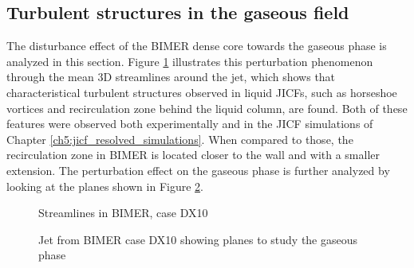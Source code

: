 \subsection{Turbulent structures in the gaseous field}
\label{subsec:ch8_turbulent_structures_BIMER}

The disturbance effect of the BIMER dense core towards the gaseous phase is analyzed in this section. Figure \ref{fig:streamlines_BIMER_from_dump} illustrates this perturbation phenomenon through the mean 3D streamlines around the jet, which shows that characteristical turbulent structures  observed in liquid JICFs, such as horseshoe vortices and recirculation zone behind the liquid column, are found. Both of these features were observed both experimentally and in the JICF simulations of Chapter \ref{ch5:jicf_resolved_simulations}. When compared to those, the recirculation zone in BIMER is located closer to the wall and with a smaller extension. The perturbation effect on the gaseous phase is further analyzed by looking at the planes shown in Figure \ref{fig:BIMER_sps_with_gaseous_planes}. 

\begin{figure}[h!]
	\centering	{}
	\vspace*{-0.5in}
	\caption{Streamlines in BIMER, case DX10}
		\label{fig:streamlines_BIMER_from_dump}
\end{figure}


\begin{figure}[h!]
	\centering	{}
	\caption{Jet from BIMER case DX10 showing planes to study the gaseous phase}
	\label{fig:BIMER_sps_with_gaseous_planes}
\end{figure}

